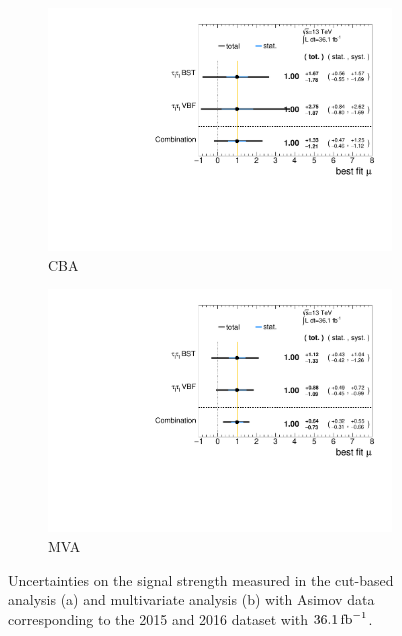 \begin{figure}[htb]
    \centering
    \begin{subfigure}[t]{0.45\textwidth}
        \includegraphics[width=\textwidth]{./plots/fit/cba/POI.pdf}
        \caption{CBA}
    \end{subfigure}
    \begin{subfigure}[t]{0.45\textwidth}
        \includegraphics[width=\textwidth]{./plots/fit/mva/POI.pdf}
        \caption{MVA}
    \end{subfigure}
    \caption{Uncertainties on the signal strength measured in the cut-based analysis (a) and multivariate analysis (b)
             with Asimov data corresponding to the 2015 and 2016 dataset with $\SI{36.1}{\invfb}$.}\label{fig:fit:result:mu}
\end{figure}

